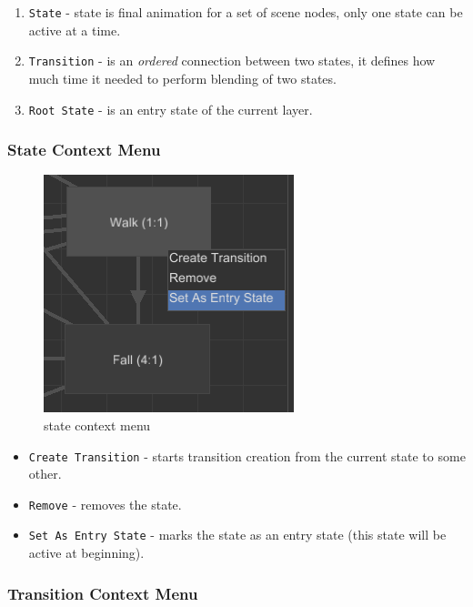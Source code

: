 \documentclass[
]{book}
\providecommand{\tightlist}{%
  \setlength{\itemsep}{0pt}\setlength{\parskip}{0pt}}
\theoremstyle{definition}
\theoremstyle{definition}
\theoremstyle{definition}
\theoremstyle{definition}
\theoremstyle{remark}
\begin{document}
\begin{enumerate}
\def\labelenumi{\arabic{enumi}.}
\tightlist
\item
  \texttt{State} - state is final animation for a set of scene nodes, only one state can be active at a time.
\item
  \texttt{Transition} - is an \emph{ordered} connection between two states, it defines how much time it needed to perform blending of two states.
\item
  \texttt{Root\ State} - is an entry state of the current layer.
\end{enumerate}

\subsubsection{State Context Menu}\label{state-context-menu}

\begin{figure}
\centering
\includegraphics{images/animation/absm_state_context_menu.png}
\caption{state context menu}
\end{figure}

\begin{itemize}
\tightlist
\item
  \texttt{Create\ Transition} - starts transition creation from the current state to some other.
\item
  \texttt{Remove} - removes the state.
\item
  \texttt{Set\ As\ Entry\ State} - marks the state as an entry state (this state will be active at beginning).
\end{itemize}

\subsubsection{Transition Context Menu}\label{transition-context-menu}
\end{document}
